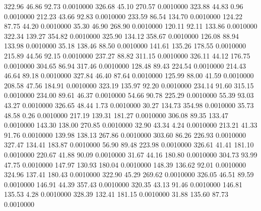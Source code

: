  322.96   46.86   92.73   0.0010000
 326.68   45.10  270.57   0.0010000
 323.88   44.83    0.96   0.0010000
 212.23   43.66   92.83   0.0010000
 233.59   86.54  134.70   0.0010000
 124.22   87.75   44.20   0.0010000
  35.30   46.90  268.90   0.0010000
 120.11   92.11  133.86   0.0010000
 322.34  139.27  354.82   0.0010000
 325.90  134.12  358.67   0.0010000
 126.08   88.94  133.98   0.0010000
  35.18  138.46   88.50   0.0010000
 141.61  135.26  178.55   0.0010000
 215.89   44.56   92.15   0.0010000
 237.27   88.82  311.15   0.0010000
 326.11   44.12  176.75   0.0010000
 304.65   86.94  317.46   0.0010000
 128.48   89.43  224.54   0.0010000
 214.43   46.64   89.18   0.0010000
 327.84   46.40   87.64   0.0010000
 125.99   88.00   41.59   0.0010000
 208.58   47.56  184.91   0.0010000
 323.19  135.97   92.20   0.0010000
 234.14   91.60  315.15   0.0010000
 234.00   89.61   46.37   0.0010000
  54.66   90.78  225.29   0.0010000
  55.39   93.03   43.27   0.0010000
 326.65   48.44    1.73   0.0010000
  30.27  134.73  354.98   0.0010000
  35.73   48.58    0.26   0.0010000
 217.19  139.31  181.27   0.0010000
 306.08   89.35  133.47   0.0010000
 143.30  138.00  270.85   0.0010000
  32.90   43.34    4.24   0.0010000
 213.21   41.33   91.76   0.0010000
 139.98  138.13  267.86   0.0010000
 303.60   86.26  226.93   0.0010000
 327.47  134.41  183.87   0.0010000
  56.90   89.48  223.98   0.0010000
 326.61   41.41  181.10   0.0010000
 220.67   41.88   90.09   0.0010000
  31.67   44.16  180.80   0.0010000
 304.73   93.99   47.75   0.0010000
 147.97  130.93  180.04   0.0010000
 148.39  136.62   92.01   0.0010000
 324.96  137.41  180.43   0.0010000
 322.90   45.29  269.62   0.0010000
 326.05   46.51   89.59   0.0010000
 146.91   44.39  357.43   0.0010000
 320.35   43.13   91.46   0.0010000
 146.81  135.53    4.28   0.0010000
 328.39  132.41  181.15   0.0010000
  31.88  135.60   87.73   0.0010000
